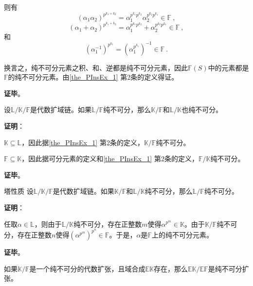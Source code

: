 则有
\begin{equation}\label{eq_PInsEx_1}
(\alpha_1\alpha_2)^{p^{k_1+k_2}}=\alpha_1^{p^{k_1}p^{k_2}}\alpha_2^{p^{k_2}p^{k_1}}\in\mathbb{F}~,
\end{equation}
\begin{equation}\label{eq_PInsEx_2}
(\alpha_1+\alpha_2)^{p^{k_1+k_2}}=\alpha_1^{p^{k_1}p^{k_2}}+\alpha_2^{p^{k_2}p^{k_1}}\in\mathbb{F}~,
\end{equation}
和
\begin{equation}\label{eq_PInsEx_3}
(\alpha_1^{-1})^{p^{k_1}} = (\alpha_1^{p^{k_1}})^{-1} \in\mathbb{F}~.
\end{equation}

换言之，纯不可分元素之积、和、逆都是纯不可分元素，因此$\mathbb{F}(S)$中的元素都是$\mathbb{F}$的纯不可分元素。由\autoref{the_PInsEx_1} 第2条的定义得证。

\textbf{证毕}。




\begin{theorem}{}
设$\mathbb{L}/\mathbb{K}/\mathbb{F}$是代数扩域链。如果$\mathbb{L}/\mathbb{F}$纯不可分，那么$\mathbb{K}/\mathbb{F}$和$\mathbb{L}/\mathbb{K}$也纯不可分。
\end{theorem}

\textbf{证明}：

$\mathbb{K}\subseteq\mathbb{L}$，因此据\autoref{the_PInsEx_1} 第2条的定义，$\mathbb{K}/\mathbb{F}$纯不可分。

$\mathbb{F}\subseteq\mathbb{K}$，因此据可分元素的定义和\autoref{the_PInsEx_1} 第2条的定义，$\mathbb{F}/\mathbb{K}$纯不可分。


\textbf{证毕}。


\begin{theorem}{塔性质}
设$\mathbb{L}/\mathbb{K}/\mathbb{F}$是代数扩域链。如果$\mathbb{K}/\mathbb{F}$和$\mathbb{L}/\mathbb{K}$纯不可分，那么$\mathbb{L}/\mathbb{F}$纯不可分。
\end{theorem}

\textbf{证明}：

任取$\alpha\in\mathbb{L}$，则由于$\mathbb{L}/\mathbb{K}$纯不可分，存在正整数$m$使得$\alpha^{p^m}\in\mathbb{K}$。由于$\mathbb{K}/\mathbb{F}$纯不可分，存在正整数$n$使得$(\alpha^{p^m})^{p^n}\in\mathbb{F}$。于是，$\alpha$是$\mathbb{F}$上的纯不可分元素。

\textbf{证毕}。


\begin{theorem}{}
如果$\mathbb{K}/\mathbb{F}$是一个纯不可分的代数扩张，且域合成$\mathbb{EK}$存在，那么$\mathbb{EK}/\mathbb{EF}$是纯不可分扩张。
\end{theorem}


